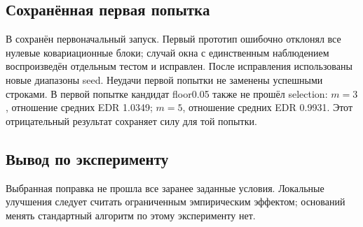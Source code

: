\subsection{Сохранённая первая попытка}
В  сохранён первоначальный запуск. Первый прототип ошибочно отклонял все нулевые ковариационные блоки; случай окна с единственным наблюдением воспроизведён отдельным тестом и исправлен. После исправления использованы новые диапазоны seed. Неудачи первой попытки не заменены успешными строками.
В первой попытке кандидат floor0.05 также не прошёл selection: $m=3$, отношение средних EDR 1.0349; $m=5$, отношение средних EDR 0.9931. Этот отрицательный результат сохраняет силу для той попытки.
\subsection{Вывод по эксперименту}
Выбранная поправка не прошла все заранее заданные условия. Локальные улучшения следует считать ограниченным эмпирическим эффектом; оснований менять стандартный алгоритм по этому эксперименту нет.
